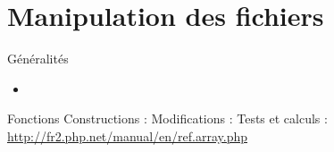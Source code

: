 
\section{Manipulation des fichiers}

\begin{frame}{Généralités}
	\begin{itemize}
		\item 
	\end{itemize}
\end{frame}

\begin{frame}[containsverbatim]{Fonctions}
	Constructions :
	Modifications :
	Tests et calculs :
	\url{http://fr2.php.net/manual/en/ref.array.php}\\
\end{frame}
 
 
